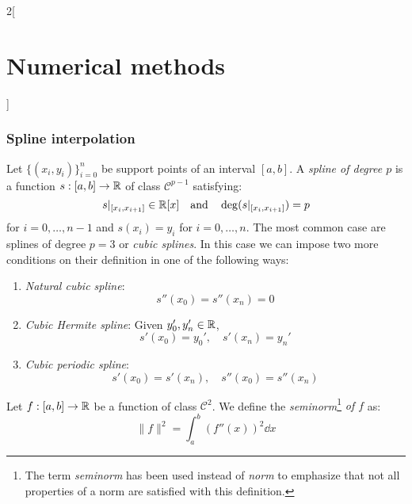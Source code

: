 \documentclass[../../../main.tex]{subfiles}
\begin{document}
\begin{multicols}{2}[\section{Numerical methods}]
    \subsubsection*{Spline interpolation}
    \begin{center}
        \begin{minipage}{\linewidth}
            \centering
            
        \end{minipage}
    \end{center}
    \begin{definition}[Spline]
        Let $\{(x_i,y_i)\}_{i=0}^n$ be support points of an interval $[a,b]$. A \textit{spline of degree $p$} is a function $s:[a,b]\rightarrow\mathbb{R}$ of class $\mathcal{C}^{p-1}$ satisfying: $$s|_{[x_i,x_{i+1}]}\in\mathbb{R}[x]\quad\text{and}\quad\deg (s|_{[x_i,x_{i+1}]})=p$$ for $i=0,\ldots,n-1$ and $s(x_i)=y_i$ for $i=0,\ldots,n$. The most common case are splines of degree  $p=3$ or \textit{cubic splines}. In this case we can impose two more conditions on their definition in one of the following ways:
        \begin{enumerate}
            \item \textit{Natural cubic spline}: $$s''(x_0)=s''(x_n)=0$$
            \item \textit{Cubic Hermite spline}: Given $y_0',y_n'\in\mathbb{R}$, $$s'(x_0)=y_0',\quad s'(x_n)=y_n'$$
            \item \textit{Cubic periodic spline}: $$s'(x_0)=s'(x_n),\quad s''(x_0)=s''(x_n)$$
        \end{enumerate}
    \end{definition}
    \begin{definition}
        Let $f:[a,b]\rightarrow\mathbb{R}$ be a function of class $\mathcal{C}^2$. We define the \textit{seminorm}\footnote{The term \textit{seminorm} has been used instead of \textit{norm} to emphasize that not all properties of a norm are satisfied with this definition.} \textit{of $f$} as: $$\|f\|^2=\int_a^b(f''(x))^2\dd x$$
    \end{definition}
    \begin{prop}

\end{prop}
\end{multicols}
\end{document}
